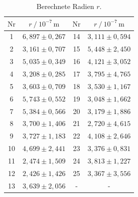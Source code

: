 \begin{table}[H]
  \centering
  \caption{Berechnete Radien $r$.}
  \label{tab:radien}
  \begin{tabular}{S S S S}
    \toprule
      {$\text{Nr}$} & {$r \mathbin{/} 10^{-7} \, \unit{\meter}$} & {$\text{Nr}$} & {$r \mathbin{/} 10^{-7} \, \unit{\meter}$}\\
          &      {$6,897 \pm 0,267$}      &      14      &      {$3,111 \pm 0,594$}     \\
     2      &      {$3,161 \pm 0,707$}      &      15      &      {$5,448 \pm 2,450$}     \\
     3      &      {$5,035 \pm 0,349$}      &      16      &      {$4,121 \pm 3,052$}     \\
     4      &      {$3,208 \pm 0,285$}      &      17      &      {$3,795 \pm 4,765$}     \\
     5      &      {$3,603 \pm 0,709$}      &      18      &      {$3,530 \pm 1,167$}     \\
     6      &      {$5,743 \pm 0,552$}      &      19      &      {$3,048 \pm 1,662$}     \\       
     7      &      {$5,384 \pm 0,566$}      &      20      &      {$3,179 \pm 1,886$}     \\
     8      &      {$3,700 \pm 1,406$}      &      21      &      {$2,720 \pm 4,615$}     \\
     9      &      {$3,727 \pm 1,183$}      &      22      &      {$4,108 \pm 2,646$}     \\
    10      &      {$4,699 \pm 2,441$}      &      23      &      {$3,376 \pm 0,831$}     \\
    11      &      {$2,474 \pm 1,509$}      &      24      &      {$3,813 \pm 1,227$}     \\
    12      &      {$2,426 \pm 1,426$}      &      25      &      {$3,367 \pm 3,556$}     \\
    13      &      {$3,639 \pm 2,056$}      &      {-}     &              {-}             \\
    \bottomrule
  \end{tabular}
\end{table}


